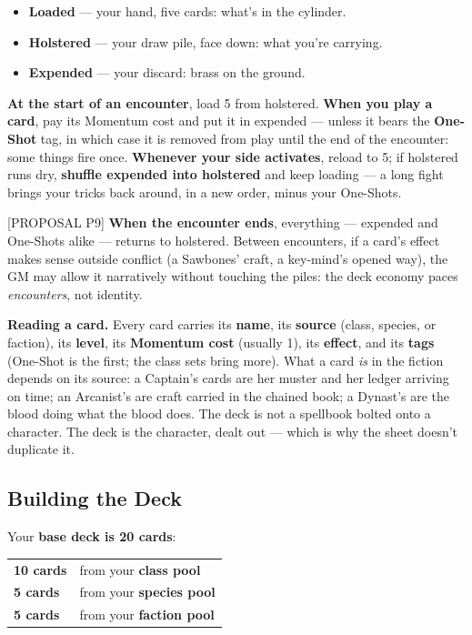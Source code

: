 \begin{itemize}
    \item \textbf{Loaded} --- your hand, five cards: what's in the cylinder.
    \item \textbf{Holstered} --- your draw pile, face down: what you're carrying.
    \item \textbf{Expended} --- your discard: brass on the ground.
\end{itemize}

\textbf{At the start of an encounter}, load 5 from holstered. \textbf{When you play a card}, pay its Momentum cost and put it in expended --- unless it bears the \textbf{One-Shot} tag, in which case it is removed from play until the end of the encounter: some things fire once. \textbf{Whenever your side activates}, reload to 5; if holstered runs dry, \textbf{shuffle expended into holstered} and keep loading --- a long fight brings your tricks back around, in a new order, minus your One-Shots.

[PROPOSAL P9] \textbf{When the encounter ends}, everything --- expended and One-Shots alike --- returns to holstered. Between encounters, if a card's effect makes sense outside conflict (a Sawbones' craft, a key-mind's opened way), the GM may allow it narratively without touching the piles: the deck economy paces \textit{encounters}, not identity.

\textbf{Reading a card.} Every card carries its \textbf{name}, its \textbf{source} (class, species, or faction), its \textbf{level}, its \textbf{Momentum cost} (usually 1), its \textbf{effect}, and its \textbf{tags} (One-Shot is the first; the class sets bring more). What a card \textit{is} in the fiction depends on its source: a Captain's cards are her muster and her ledger arriving on time; an Arcanist's are craft carried in the chained book; a Dynast's are the blood doing what the blood does. The deck is not a spellbook bolted onto a character. The deck is the character, dealt out --- which is why the sheet doesn't duplicate it.

\subsection{Building the Deck}

Your \textbf{base deck is 20 cards}:

\begin{center}
\begin{tabular}{ll}
\textbf{10 cards} & from your \textbf{class pool} \\
\textbf{5 cards} & from your \textbf{species pool} \\
\textbf{5 cards} & from your \textbf{faction pool} \\
\end{tabular}
\end{center}

